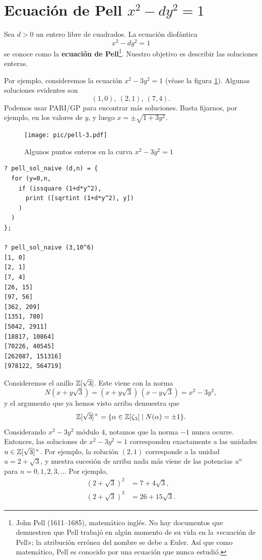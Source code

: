 
\section{Ecuación de Pell \texorpdfstring{$x^2 - dy^2 = 1$}{x² - dy² = 1}}

Sea $d > 0$ un entero libre de cuadrados. La ecuación diofántica
$$x^2 - dy^2 = 1$$
se conoce como la \textbf{ecuación de Pell}\footnote{John Pell (1611--1685),
  matemático inglés. No hay documentos que demuestren que Pell trabajó en algún
  momento de su vida en la «ecuación de Pell»; la atribución errónea del
  nombre se debe a Euler. Así que como matemático, Pell es conocido por una
  ecuación que nunca estudió.}.
Nuestro objetivo es describir las soluciones enteras.

Por ejemplo, consideremos la ecuación $x^2 - 3y^2 = 1$ (véase la figura
\ref{fig:pell-3}). Algunas soluciones evidentes son
$$(1, 0), ~ (2, 1), ~ (7, 4).$$
Podemos usar PARI/GP para encontrar más soluciones. Basta fijarnos, por ejemplo,
en los valores de $y$, y luego $x = \pm\sqrt{1 + 3y^2}$.

\begin{figure}
  \begin{center}
    \texttt{[image: pic/pell-3.pdf]}
  \end{center}

  \caption{Algunos puntos enteros en la curva $x^2 - 3y^2 = 1$}
  \label{fig:pell-3}
\end{figure}

\begin{shaded}
\begin{verbatim}
? pell_sol_naive (d,n) = {
  for (y=0,n,
    if (issquare (1+d*y^2),
      print ([sqrtint (1+d*y^2), y])
    )
  )
};

? pell_sol_naive (3,10^6)
[1, 0]
[2, 1]
[7, 4]
[26, 15]
[97, 56]
[362, 209]
[1351, 780]
[5042, 2911]
[18817, 10864]
[70226, 40545]
[262087, 151316]
[978122, 564719]
\end{verbatim}
\end{shaded}

Consideremos el anillo $\mathbb{Z} [\sqrt{3}]$. Este viene con la norma
$$N (x + y\sqrt{3}) = (x + y\sqrt{3})\,(x - y\sqrt{3}) = x^2 - 3y^2,$$
y el argumento que ya hemos visto arriba demuestra que
\[ \mathbb{Z} [\sqrt{3}]^\times
       = \{ \alpha \in \mathbb{Z} [\zeta_3] \mid N (\alpha) = \pm 1 \}. \]
Considerando $x^2 - 3y^2$ módulo $4$, notamos que la norma $-1$ nunca
ocurre. Entonces, las soluciones de ${x^2 - 3y^2 = 1}$ corresponden exactamente
a las unidades $u \in \mathbb{Z} [\sqrt{3}]^\times$. Por ejemplo, la solución $(2,1)$
corresponde a la unidad $u = 2 + \sqrt{3}$, y nuestra sucesión de arriba nada
más viene de las potencias $u^n$ para $n = 0,1,2,3,\ldots$ Por ejemplo,
\begin{align*}
  (2 + \sqrt{3})^2 & = 7 + 4\sqrt{3},\\
  (2 + \sqrt{3})^3 & = 26 + 15\sqrt{3}.
\end{align*}

